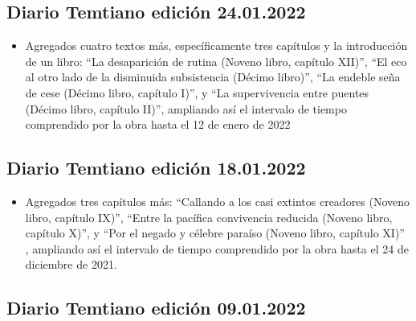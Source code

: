 \documentclass[
]{book}
\providecommand{\tightlist}{%
  \setlength{\itemsep}{0pt}\setlength{\parskip}{0pt}}
\begin{document}
\hypertarget{diario-temtiano-ediciuxf3n-24.01.2022}{%
\subsection*{Diario Temtiano edición 24.01.2022}\label{diario-temtiano-ediciuxf3n-24.01.2022}}

\begin{itemize}
\tightlist
\item
  Agregados cuatro textos más, específicamente tres capítulos y la introducción de un libro: ``La desaparición de rutina (Noveno libro, capítulo XII)'', ``El eco al otro lado de la disminuida subsistencia (Décimo libro)'', ``La endeble seña de cese (Décimo libro, capítulo I)'', y ``La supervivencia entre puentes (Décimo libro, capítulo II)'', ampliando así el intervalo de tiempo comprendido por la obra hasta el 12 de enero de 2022
\end{itemize}

\hypertarget{diario-temtiano-ediciuxf3n-18.01.2022}{%
\subsection*{Diario Temtiano edición 18.01.2022}\label{diario-temtiano-ediciuxf3n-18.01.2022}}

\begin{itemize}
\tightlist
\item
  Agregados tres capítulos más: ``Callando a los casi extintos creadores (Noveno libro, capítulo IX)'', ``Entre la pacífica convivencia reducida (Noveno libro, capítulo X)'', y ``Por el negado y célebre paraíso (Noveno libro, capítulo XI)'' , ampliando así el intervalo de tiempo comprendido por la obra hasta el 24 de diciembre de 2021.
\end{itemize}

\hypertarget{diario-temtiano-ediciuxf3n-09.01.2022}{%
\subsection*{Diario Temtiano edición 09.01.2022}\label{diario-temtiano-ediciuxf3n-09.01.2022}}
\end{document}
